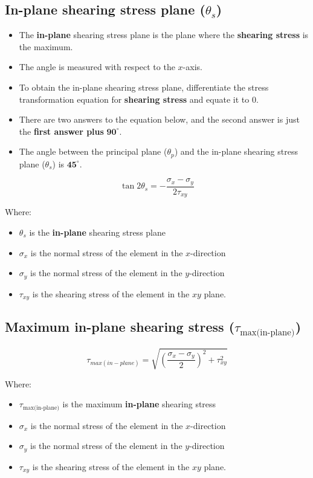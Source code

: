 \documentclass[11pt]{article}
\begin{document}
\newpage

\subsection{In-plane shearing stress plane (\(\theta_s\))}
\label{sec:org3ea5ee2}
\begin{itemize}
\item The \textbf{in-plane} shearing stress plane is the plane where the \textbf{shearing stress} is the maximum.
\item The angle is measured with respect to the \(x\)-axis.
\item To obtain the in-plane shearing stress plane, differentiate the stress transformation equation for \textbf{shearing stress} and equate it to 0.
\item There are two answers to the equation below, and the second answer is just the \textbf{first answer plus} \(\boldsymbol{90^{\circ}}\).
\item The angle between the principal plane (\(\theta_p\)) and the in-plane shearing stress plane (\(\theta_s\)) is \(\boldsymbol{45^{\circ}}\).
\end{itemize}

\[\tan 2 \theta_s = - \frac{\sigma_x - \sigma_y}{2 \tau_{xy}}\]

Where:
\begin{itemize}
\item \(\theta_s\) is the \textbf{in-plane} shearing stress plane
\item \(\sigma_x\) is the normal stress of the element in the \(x\)-direction
\item \(\sigma_y\) is the normal stress of the element in the \(y\)-direction
\item \(\tau_{xy}\) is the shearing stress of the element in the \(xy\) plane.
\end{itemize}

\newpage

\subsection{Maximum in-plane shearing stress (\(\tau_{\text{max(in-plane)}}\))}
\label{sec:org00ba4c0}
\[\tau_{max(in-plane)} = \sqrt{\left( \frac{\sigma_x - \sigma_y}{2} \right)^2 + \tau_{xy}^2}\]

Where:
\begin{itemize}
\item \(\tau_{\text{max(in-plane)}}\) is the maximum \textbf{in-plane} shearing stress
\item \(\sigma_x\) is the normal stress of the element in the \(x\)-direction
\item \(\sigma_y\) is the normal stress of the element in the \(y\)-direction
\item \(\tau_{xy}\) is the shearing stress of the element in the \(xy\) plane.
\end{itemize}
\end{document}
